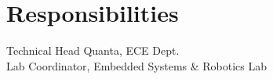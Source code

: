\documentclass[]{deedy-resume-openfont}
\begin{document}
\begin{minipage}[t]{0.33\textwidth}

\section{Responsibilities}
\textbullet{} Technical Head Quanta, ECE Dept. \\
\textbullet{} Lab Coordinator, Embedded Systems \& Robotics Lab
\sectionsep


%
%

\end{minipage} 
\hfill
\end{document}
